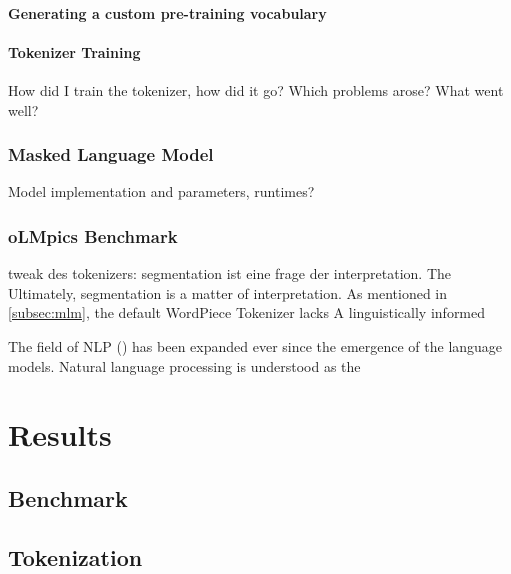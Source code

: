 \documentclass[english]{ttlab-qualify}
\begin{document}
    \subsubsection{Generating a custom pre-training vocabulary}
    \label{subsubsec:generating-a-custom-pre-training-vocabulary}

    \subsubsection{Tokenizer Training}
    \label{subsubsec:tokenizer-training}
    How did I train the tokenizer, how did it go?
    Which problems arose? What went well?

    \subsection{Masked Language Model}
    \label{subsec:masked-language-model}
    Model implementation and parameters, runtimes?

    \subsection{oLMpics Benchmark}
    \label{subsec:olmpics-benchmark}



    tweak des tokenizers: segmentation ist eine frage der interpretation.
    The
    Ultimately, segmentation is a matter of interpretation.
    As mentioned in \ref{subsec:mlm}, the default WordPiece Tokenizer lacks
    A linguistically informed



    The field of NLP  (\cite{METZLER2016}) has been expanded ever since the emergence of the language models.
    Natural language processing is understood as the
    \\

    \chapter{Results}
    \label{ch:results}

    \section{Benchmark}
    \label{sec:benchmark}


    \section{Tokenization}
    \label{sec:tokenization}
\end{document}
